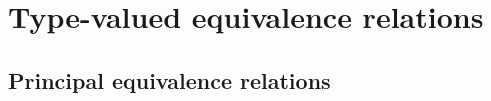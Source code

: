\chapter{Type-valued equivalence relations}

\section{Principal equivalence relations}

\begin{comment}
In the setting of homotopy type theory, as described by the Univalent Foundations Program in \cite{hottbook}, `ordinary' equivalence relations on a type $A$ are specified as $\prop$-valued binary relations which are reflexive, symmetric, and transitive. When $\mathcal{R}$ is an equivalence relation in this sense, then the quotient $A/\mathcal{R}$ can be specified as the image of $\mathcal{R}:A\to (A\to \prop)$, as a subtype of $A\to\prop$, which is always a set. Such `set-quotients' have been first constructed in \cite{UniMath2015,UniMath} using propositional resizing, and as higher inductive types in \cite{hottbook} in the case where $A$ is assumed to be a set. In fact, using the join construction \cite{joinconstruction}, the quotient $A/\mathcal{R}$ can be constructed as a sequential colimit of pushouts. 

Prop-valued equivalence relations as described above are just one level in a hierarchy of equivalence relations. The next level up consists of `$1$-equivalence relations', or `pre-groupoid structures' on a type $A$, the data of which endows $A$ with the structure of a pre-groupoid in the sense of Ahrens, Kapulkin, Shulman \cite{AhrensKapulkinShulman}. In the case of pre-groupoid structures one also needs to account for associativity, unit laws, and inverse laws. Groupoid quotients have been defined as higher inductive types in homotopy type theory by Sojakova \cite{SojakovaPhD}.

The notions of prop-valued equivalence relations and $1$-equivalence relations fit in a hierarchy of $n$-equivalence relations that actually starts at level $-1$ with \emph{trivial} relations. In this hierarchy, displayed in \autoref{tab:hierarchy}, the index corresponds to the truncation level of the quotient, so that a $1$-equivalence relation is indeed a pre-groupoid structure in the sence of \cite{AhrensKapulkinShulman}.


\end{comment}
